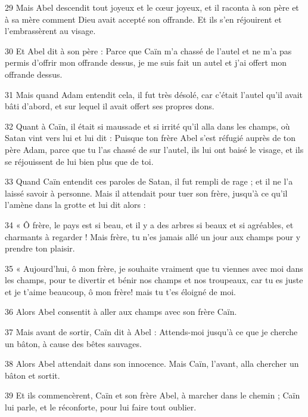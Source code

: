 \par 29 Mais Abel descendit tout joyeux et le cœur joyeux, et il raconta à son père et à sa mère comment Dieu avait accepté son offrande. Et ils s'en réjouirent et l'embrassèrent au visage.

\par 30 Et Abel dit à son père : Parce que Caïn m'a chassé de l'autel et ne m'a pas permis d'offrir mon offrande dessus, je me suis fait un autel et j'ai offert mon offrande dessus.

\par 31 Mais quand Adam entendit cela, il fut très désolé, car c'était l'autel qu'il avait bâti d'abord, et sur lequel il avait offert ses propres dons.

\par 32 Quant à Caïn, il était si maussade et si irrité qu'il alla dans les champs, où Satan vint vers lui et lui dit : Puisque ton frère Abel s'est réfugié auprès de ton père Adam, parce que tu l'as chassé de sur l'autel, ils lui ont baisé le visage, et ils se réjouissent de lui bien plus que de toi.

\par 33 Quand Caïn entendit ces paroles de Satan, il fut rempli de rage ; et il ne l'a laissé savoir à personne. Mais il attendait pour tuer son frère, jusqu'à ce qu'il l'amène dans la grotte et lui dit alors :

\par 34 « Ô frère, le pays est si beau, et il y a des arbres si beaux et si agréables, et charmants à regarder ! Mais frère, tu n'es jamais allé un jour aux champs pour y prendre ton plaisir.

\par 35 « Aujourd'hui, ô mon frère, je souhaite vraiment que tu viennes avec moi dans les champs, pour te divertir et bénir nos champs et nos troupeaux, car tu es juste et je t'aime beaucoup, ô mon frère! mais tu t'es éloigné de moi.

\par 36 Alors Abel consentit à aller aux champs avec son frère Caïn.

\par 37 Mais avant de sortir, Caïn dit à Abel : Attends-moi jusqu'à ce que je cherche un bâton, à cause des bêtes sauvages.

\par 38 Alors Abel attendait dans son innocence. Mais Caïn, l'avant, alla chercher un bâton et sortit.

\par 39 Et ils commencèrent, Caïn et son frère Abel, à marcher dans le chemin ; Caïn lui parle, et le réconforte, pour lui faire tout oublier.

